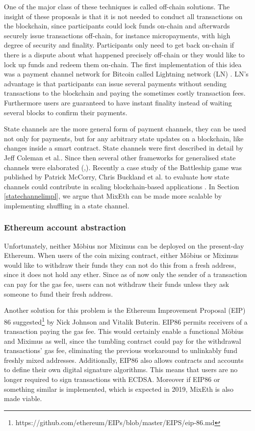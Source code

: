 \documentclass[conference, compsoc]{IEEEtran}
\theoremstyle{definition}
\begin{document}
One of the major class of these techniques is called off-chain solutions. The insight of these proposals is that it is not needed to conduct all transactions on the blockchain, since participants could lock funds on-chain and afterwards securely issue transactions off-chain, for instance micropayments, with high degree of security and finality. Participants only need to get back on-chain if there is a dispute about what happened precisely off-chain or they would like to lock up funds and redeem them on-chain. The first implementation of this idea was a payment channel network for Bitcoin called Lightning network (LN) \cite{poon2016bitcoin}. LN's advantage is that participants can issue several payments without sending transactions to the blockchain and paying the sometimes costly transaction fees. Furthermore users are guaranteed to have instant finality instead of waiting several blocks to confirm their payments. 

State channels are the more general form of payment channels, they can be used not only for payments, but for any arbitrary state updates on a blockchain, like changes inside a smart contract. State channels were first described in detail by Jeff Coleman et al.\cite{coleman2018counterfactual}. Since then several other frameworks for generalised state channels were elaborated (\cite{dziembowski2017perun},\cite{mccorryyou}). Recently a case study of the Battleship game was published by Patrick McCorry, Chris Buckland et al. to evaluate how state channels could contribute in scaling blockchain-based applications \cite{mccorryyou}. In Section \ref{statechannelimpl}, we argue that MixEth can be made more scalable by implementing shuffling in a state channel. 

\subsubsection{Ethereum account abstraction}
Unfortunately, neither Möbius nor Miximus can be deployed on the present-day Ethereum. When users of the coin mixing contract, either Möbius or Miximus would like to withdraw their funds they can not do this from a fresh address, since it does not hold any ether. Since as of now only the sender of a transaction can pay for the gas fee, users can not withdraw their funds unless they ask someone to fund their fresh address.     

Another solution for this problem is the Ethereum Improvement Proposal (EIP) 86 suggested\footnote{https://github.com/ethereum/EIPs/blob/master/EIPS/eip-86.md} by Nick Johnson and Vitalik Buterin. EIP86 permits receivers of a transaction paying the gas fee. This would certainly enable a functional Möbius and Miximus as well, since the tumbling contract could pay for the withdrawal transactions' gas fee, eliminating the previous workaround to unlinkably fund freshly mixed addresses. Additionally, EIP86 also allows contracts and accounts to define their own digital signature algorithms. This means that users are no longer required to sign transactions with ECDSA. Moreover if EIP86 or something similar is implemented, which is expected in 2019, MixEth is also made viable. 
\end{document}
